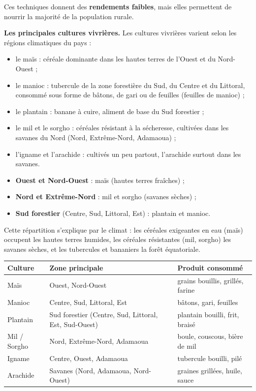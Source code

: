 \documentclass[11pt]{article}
\newcommand{\cle}[1]{{\popxbold\color{popdark}#1}}
\begin{document}
Ces techniques donnent des \textbf{rendements faibles}, mais elles permettent de nourrir la majorité de la population rurale.

\textbf{Les principales cultures vivrières.} Les cultures vivrières varient selon les régions climatiques du pays :

\begin{itemize}
\item le \cle{maïs} : céréale dominante dans les hautes terres de l'Ouest et du Nord-Ouest ;
\item le \cle{manioc} : tubercule de la zone forestière du Sud, du Centre et du Littoral, consommé sous forme de bâtons, de gari ou de feuilles (feuilles de manioc) ;
\item le \cle{plantain} : banane à cuire, aliment de base du Sud forestier ;
\item le \cle{mil} et le \cle{sorgho} : céréales résistant à la sécheresse, cultivées dans les savanes du Nord (Nord, Extrême-Nord, Adamaoua) ;
\item l'\cle{igname} et l'\cle{arachide} : cultivés un peu partout, l'arachide surtout dans les savanes.
\end{itemize}

\begin{aretenir}
\begin{itemize}
\item \textbf{Ouest et Nord-Ouest} : maïs (hautes terres fraîches) ;
\item \textbf{Nord et Extrême-Nord} : mil et sorgho (savanes sèches) ;
\item \textbf{Sud forestier} (Centre, Sud, Littoral, Est) : plantain et manioc.
\end{itemize}
Cette répartition s'explique par le climat : les céréales exigeantes en eau (maïs) occupent les hautes terres humides, les céréales résistantes (mil, sorgho) les savanes sèches, et les tubercules et bananiers la forêt équatoriale.
\end{aretenir}

\begin{center}
\begin{tabularx}{\linewidth}{|l|X|X|}\hline
\rowcolor{popblueL} \textbf{Culture} & \textbf{Zone principale} & \textbf{Produit consommé} \\ \hline
Maïs & Ouest, Nord-Ouest & grains bouillis, grillés, farine \\ \hline
Manioc & Centre, Sud, Littoral, Est & bâtons, gari, feuilles \\ \hline
Plantain & Sud forestier (Centre, Sud, Littoral, Est, Sud-Ouest) & plantain bouilli, frit, braisé \\ \hline
Mil / Sorgho & Nord, Extrême-Nord, Adamaoua & boule, couscous, bière de mil \\ \hline
Igname & Centre, Ouest, Adamaoua & tubercule bouilli, pilé \\ \hline
Arachide & Savanes (Nord, Adamaoua, Nord-Ouest) & graines grillées, huile, sauce \\ \hline
\end{tabularx}
\end{center}
\end{document}
